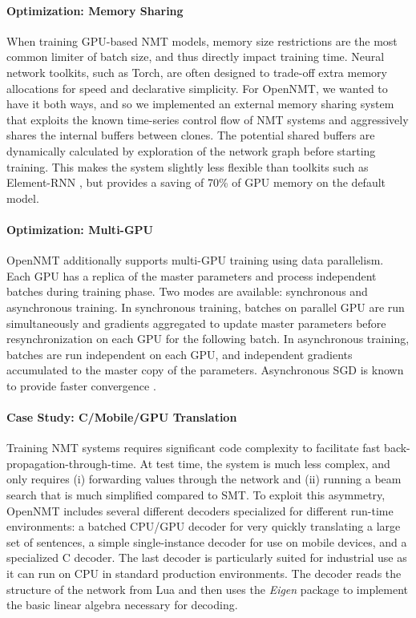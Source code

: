 \documentclass[11pt]{article}
\begin{document}
\paragraph{Optimization: Memory Sharing}

When training GPU-based NMT models, memory size restrictions are the
most common limiter of batch size, and thus directly impact training
time. Neural network toolkits, such as Torch, are often designed to
trade-off extra memory allocations for speed and declarative
simplicity. For OpenNMT, we wanted to have it both ways, and so we
implemented an external memory sharing system that exploits the known
time-series control flow of NMT systems and aggressively shares the
internal buffers between clones. The potential shared buffers are dynamically
calculated by exploration of the network graph before starting
training.  This makes the system slightly less flexible than toolkits
such as Element-RNN \cite{DBLP:journals/corr/LeonardWW15}, but
provides a saving of 70\% of GPU memory on the default model. 

\paragraph{Optimization: Multi-GPU} OpenNMT additionally supports multi-GPU
training using data parallelism. Each GPU has a replica of the master parameters
 and process independent batches during training phase.
Two modes are available: synchronous and asynchronous training.
In synchronous training, batches on parallel GPU are run simultaneously and gradients 
aggregated to update master parameters before resynchronization on each GPU for the following batch.
In asynchronous training, batches are run independent on each GPU, and independent gradients accumulated 
to the master copy of the parameters. Asynchronous SGD is known to provide faster convergence \cite{dean2012large}.

\paragraph{Case Study: C/Mobile/GPU Translation} Training NMT
systems requires significant code complexity to facilitate fast
back-propagation-through-time. At test time, the
system is much less complex, and only requires (i) forwarding values
through the network and (ii) running a beam search that is much
simplified compared to SMT. To exploit this asymmetry, OpenNMT includes
several different decoders specialized for different run-time
environments: a batched CPU/GPU decoder for very quickly translating a
large set of sentences, a simple single-instance decoder for use on
mobile devices, and a specialized C decoder. The last decoder is
particularly suited for industrial use as it can run on CPU in standard
production environments. The decoder reads the structure of the
network from Lua and then uses the \textit{Eigen} package to implement the
basic linear algebra necessary for decoding. 
\end{document}
